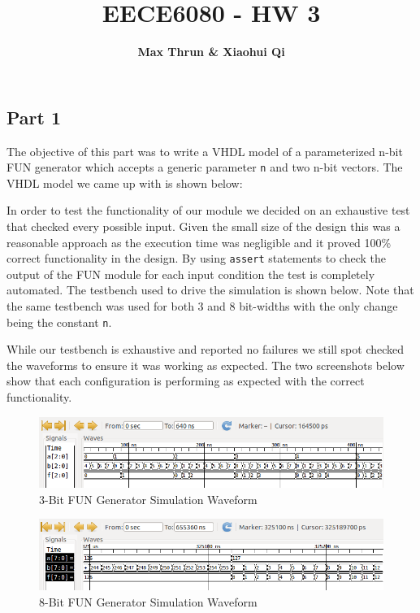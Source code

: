 \documentclass{article}
\title{
    \vspace{2in}
    \textmd{\textbf{EECE6080 - HW 3}}\\
    \vspace{4in}
}
\author{\textbf{Max Thrun \& Xiaohui Qi}}
\begin{document}
\maketitle
\newpage
\subsection*{Part 1}

The objective of this part was to write a VHDL model of a parameterized n-bit
FUN generator which accepts a generic parameter \texttt{n} and
two n-bit vectors. The VHDL model we came up with is shown below:



In order to test the functionality of our module we decided on an exhaustive
test that checked every possible input. Given the small size of the design this
was a reasonable approach as the execution time was negligible and it proved
100\% correct functionality in the design. By using \texttt{assert} statements
to check the output of the FUN module for each input condition the test is
completely automated.  The testbench used to drive the simulation is shown
below. Note that the same testbench was used for both 3 and 8 bit-widths with
the only change being the constant \texttt{n}.



\newpage
While our testbench is exhaustive and reported no failures we still spot
checked the waveforms to ensure it was working as expected. The two screenshots
below show that each configuration is performing as expected with the correct
functionality.

\vspace{0.25in}
\begin{figure}[H]
    \centering
    \includegraphics[width=\linewidth]{../part_1/fun_3.png}
    \caption{3-Bit FUN Generator Simulation Waveform}
\end{figure}
\vspace{0.25in}
\begin{figure}[H]
    \centering
    \includegraphics[width=\linewidth]{../part_1/fun_8.png}
    \caption{8-Bit FUN Generator Simulation Waveform}
\end{figure}
\end{document}
